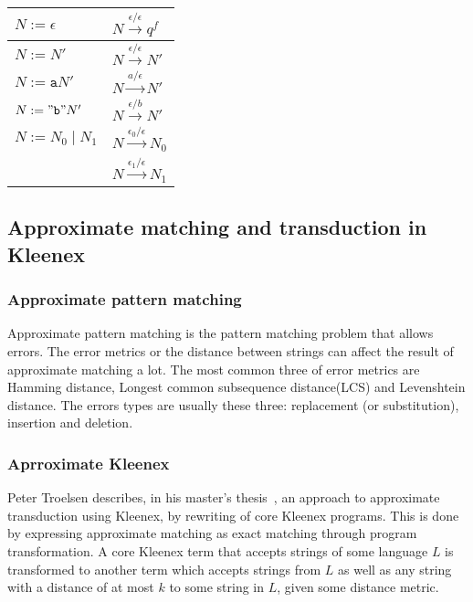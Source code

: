 \begin{center}
  \begin{tabular}{|l|l|}
    \hline
    $N := \epsilon$       & $N \xrightarrow{\epsilon/\epsilon} q^f$   \\
    \hline
    $N := N'$             & $N \xrightarrow{\epsilon/\epsilon} N'$    \\
    \hline
    $N := \mathtt{a}N'$   & $N \xrightarrow{a/\epsilon} N'$           \\
    \hline
    $N := \mathtt{"b"}N'$ & $N \xrightarrow{\epsilon/b} N'$           \\
    \hline
    $N := N_0 \;|\; N_1$  & $N \xrightarrow{\epsilon_0/\epsilon} N_0$ \\
                          & $N \xrightarrow{\epsilon_1/\epsilon} N_1$ \\
    \hline
  \end{tabular}
\end{center}


\subsection{Approximate matching and transduction in Kleenex}
\subsubsection{Approximate pattern matching}
Approximate pattern matching is the pattern matching problem that allows errors. The error metrics or the distance between strings can affect the result of approximate matching a lot. The most common three of error metrics are Hamming distance, Longest common subsequence distance(LCS) and Levenshtein distance. The errors types are usually these three: replacement (or substitution), insertion and deletion.


\subsubsection{Aprroximate Kleenex}
Peter Troelsen describes, in his master's
thesis~\cite{troelsen2016approximate}, an approach to approximate transduction
using Kleenex, by rewriting of core Kleenex programs. This is done by
expressing approximate matching as exact matching through program
transformation. A core Kleenex term that accepts strings of some language $L$
is transformed to another term which accepts strings from $L$ as well as any
string with a distance of at most $k$ to some string in $L$, given some
distance metric.

